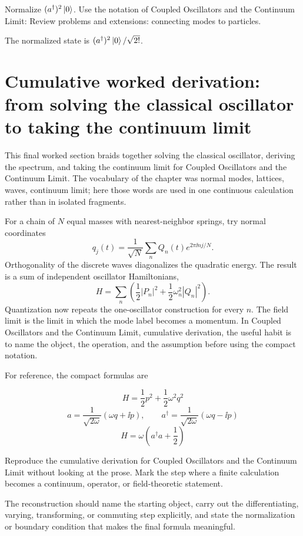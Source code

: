 \begin{exercise}
Normalize \((a^\dagger)^2\left|0\right\rangle\).  Use the notation of Coupled Oscillators and the Continuum Limit: Review problems and extensions: connecting modes to particles.
\begin{answer}
The normalized state is \((a^\dagger)^2\left|0\right\rangle/\sqrt{2!}\).
\end{answer}
\end{exercise}



\section{Cumulative worked derivation: from solving the classical oscillator to taking the continuum limit}

This final worked section braids together solving the classical oscillator, deriving the spectrum, and taking the continuum limit for Coupled Oscillators and the Continuum Limit.  The vocabulary of the chapter was normal modes, lattices, waves, continuum limit; here those words are used in one continuous calculation rather than in isolated fragments.

For a chain of \(N\) equal masses with nearest-neighbor springs, try normal coordinates
\[
  q_j(t)=\frac1{\sqrt N}\sum_n Q_n(t)e^{2\pi\ii nj/N}.
\]
Orthogonality of the discrete waves diagonalizes the quadratic energy.  The result is a sum of independent oscillator Hamiltonians,
\[
  H=\sum_n\left(\frac12|P_n|^2+\frac12\omega_n^2|Q_n|^2\right).
\]
Quantization now repeats the one-oscillator construction for every \(n\).  The field limit is the limit in which the mode label becomes a momentum.  In Coupled Oscillators and the Continuum Limit, cumulative derivation, the useful habit is to name the object, the operation, and the assumption before using the compact notation.

For reference, the compact formulas are

\[
  H=\frac12p^2+\frac12\omega^2q^2
\]
\[
  a=\frac{1}{\sqrt{2\omega}}(\omega q+\ii p),\qquad a^\dagger=\frac{1}{\sqrt{2\omega}}(\omega q-\ii p)
\]
\[
  H=\omega\left(a^\dagger a+\frac12\right)
\]

\begin{exercise}
Reproduce the cumulative derivation for Coupled Oscillators and the Continuum Limit without looking at the prose.  Mark the step where a finite calculation becomes a continuum, operator, or field-theoretic statement.
\begin{answer}
The reconstruction should name the starting object, carry out the differentiating, varying, transforming, or commuting step explicitly, and state the normalization or boundary condition that makes the final formula meaningful.
\end{answer}
\end{exercise}



